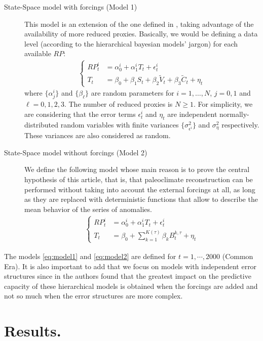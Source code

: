 \documentclass[11pt]{amsart}
\theoremstyle{plain}
\theoremstyle{definition}
\theoremstyle{remark}
\begin{document}
\begin{description}
\item[State-Space model with forcings (Model 1)]
This model is an extension of the one defined in \cite{Barboza2014}, taking
advantage of the availability of more reduced proxies. Basically, we would be
defining a data level (according to the hierarchical bayesian models' jargon)
for each available $RP$:
\begin{align}\label{eq:model1}
  \begin{cases}
    RP_t^i&=\alpha_0^i+\alpha_1^iT_t+\epsilon^i_t\\
  T_t&=\beta_0+\beta_1S_t+\beta_2\tilde V_t+\beta_3\tilde C_t+\eta_t
  \end{cases}
\end{align}
where $\{\alpha^i_j\}$ and $\{\beta_\ell\}$ are random parameters for
$i=1,\ldots,N$, $j=0,1$ and $\ell=0,1,2,3$. The number of reduced proxies is
$N\geq 1$. For simplicity, we are considering that the error terms
$\epsilon^i_t$ and $\eta_t$ are
independent normally-distributed random variables with finite variances
$\{\sigma^2_{\epsilon^i}\}$ and $\sigma^2_{\eta}$ respectively. These variances
are also considered as random.   
\item[State-Space model without forcings (Model 2)]
  We define the following model whose main reason is to prove the central hypothesis of this article, that is, that
paleoclimate reconstruction can be performed without taking into account the
external forcings at all, as long as they are replaced with deterministic
functions that allow to describe the mean behavior of the series of anomalies.
\begin{align}\label{eq:model2}
  \begin{cases}
    RP_t^i&=\alpha_0^i+\alpha_1^iT_t+\epsilon^i_t\\
  T_t&=\beta_0+\sum_{k=1}^{K(\tau)}\beta_k B_t^{k,\tau}+\eta_t
  \end{cases}
\end{align}
\end{description}
The models \eqref{eq:model1} and \eqref{eq:model2} are defined for
$t=1,\cdots,2000$ (Common Era). It is also important to add that we focus on
models with independent error structures since in \cite{Barboza2014} the authors
found that the greatest impact on the predictive capacity of these hierarchical
models is obtained when the forcings are added and not so much when the error
structures are more complex.

\section{Results.}
\label{sec:results}
\end{document}
